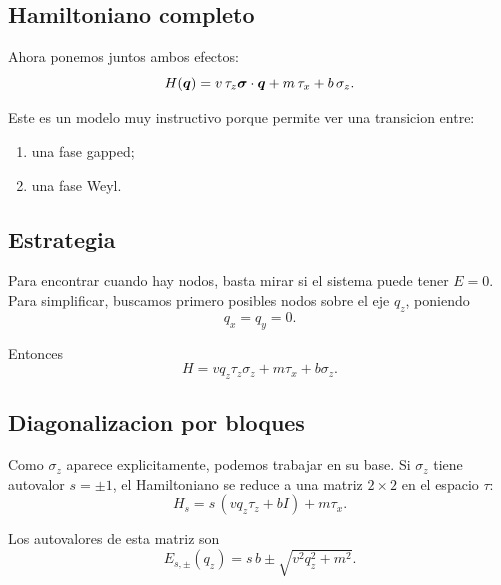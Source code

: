 \subsection{Hamiltoniano completo}

Ahora ponemos juntos ambos efectos:
\begin{equation}
H(\bm{q})=v\,\tau_z \bm{\sigma}\cdot\bm{q} + m\,\tau_x + b\,\sigma_z.
\label{c13:eq:fullH}
\end{equation}

Este es un modelo muy instructivo porque permite ver una transicion entre:

\begin{enumerate}[leftmargin=*]
  \item una fase gapped;
  \item una fase Weyl.
\end{enumerate}

\subsection{Estrategia}

Para encontrar cuando hay nodos, basta mirar si el sistema puede tener \(E=0\). Para simplificar, buscamos primero posibles nodos sobre el eje \(q_z\), poniendo
\begin{equation}
q_x=q_y=0.
\end{equation}

Entonces
\begin{equation}
H = v q_z \tau_z \sigma_z + m\tau_x + b\sigma_z.
\label{c13:eq:axisH}
\end{equation}

\subsection{Diagonalizacion por bloques}

Como \(\sigma_z\) aparece explicitamente, podemos trabajar en su base. Si \(\sigma_z\) tiene autovalor \(s=\pm 1\), el Hamiltoniano se reduce a una matriz \(2\times 2\) en el espacio \(\tau\):
\begin{equation}
H_s = s\,(v q_z \tau_z + bI) + m\tau_x.
\label{c13:eq:Hs}
\end{equation}

Los autovalores de esta matriz son
\begin{equation}
E_{s,\pm}(q_z)= s\,b \pm \sqrt{v^2 q_z^2 + m^2}.
\label{c13:eq:Es}
\end{equation}

